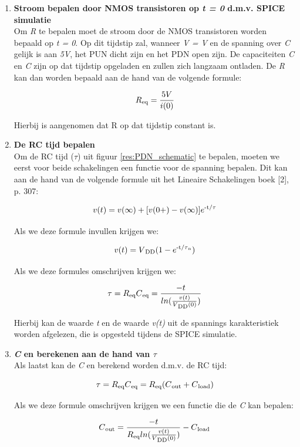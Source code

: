 \documentclass{article}
\begin{document}
\begin{enumerate}

\item \textbf{Stroom bepalen door NMOS transistoren op \emph{t = 0} d.m.v. SPICE simulatie}\\
Om \emph{R} te bepalen moet de stroom door de NMOS transistoren worden bepaald op \emph{t = 0}. Op dit tijdstip zal, wanneer \emph{V = V} en de spanning over \emph{C} gelijk is aan \emph{5V}, het PUN dicht zijn en het PDN open zijn.  De capaciteiten \emph{C} en \emph{C} zijn op dat tijdstip opgeladen en zullen zich langzaam ontladen. De \emph{R} kan dan worden bepaald aan de hand van de volgende formule:

\begin{equation}
R\textsubscript{eq} = \frac{5V}{i(0)}
\end{equation}

Hierbij is aangenomen dat R op dat tijdstip constant is.

\item \textbf{De RC tijd bepalen}\\
Om de RC tijd ($\tau$) uit figuur \ref{res:PDN_schematic} te bepalen, moeten we eerst voor beide schakelingen een functie voor de spanning bepalen. Dit kan aan de hand van de volgende formule uit het Lineaire Schakelingen boek [2], p. 307:

\begin{equation}
v(t) = v(\infty) + [v(0+) - v(\infty)]e\textsuperscript{-t/$\tau$}
\end{equation}

Als we deze formule invullen krijgen we:

\begin{equation}
v(t) = V\textsubscript{DD}(1 - e\textsuperscript{-t/$\tau$\textsubscript{n}})
\end{equation}

Als we deze formules omschrijven krijgen we:

\begin{equation}
\tau = R\textsubscript{eq}C\textsubscript{eq} = \frac{-t}{ln(\frac{v(t)}{V\textsubscript{DD}(0)})}
\end{equation}

Hierbij kan de waarde \emph{t} en de waarde \emph{v(t)} uit de spannings karakteristiek worden afgelezen, die is opgesteld tijdens de SPICE simulatie.

\item \textbf{\emph{C} en berekenen aan de hand van $\tau$}\\
Als laatst kan de \emph{C} en berekend worden d.m.v. de RC tijd:

\begin{equation}
\tau = R\textsubscript{eq}C\textsubscript{eq} = R\textsubscript{eq}(C\textsubscript{out} + C\textsubscript{load})
\end{equation}

Als we deze formule omschrijven krijgen we een functie die de \emph{C} kan bepalen:

\begin{equation}
C\textsubscript{out} = \frac{-t}{R\textsubscript{eq}ln(\frac{v(t)}{V\textsubscript{DD}(0)})} - C\textsubscript{load}
\end{equation}

\end{enumerate}
\end{document}
